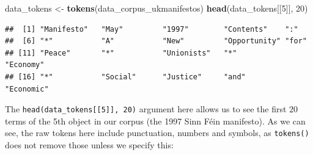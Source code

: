 \documentclass[
]{book}
\newenvironment{Shaded}{\begin{snugshade}}{\end{snugshade}}
\newcommand{\DecValTok}[1]{\textcolor[rgb]{0.00,0.00,0.81}{#1}}
\newcommand{\FunctionTok}[1]{\textcolor[rgb]{0.13,0.29,0.53}{\textbf{#1}}}
\newcommand{\NormalTok}[1]{#1}
\newcommand{\OtherTok}[1]{\textcolor[rgb]{0.56,0.35,0.01}{#1}}
\begin{document}
\begin{Shaded}
\begin{Highlighting}[]
\NormalTok{data\_tokens }\OtherTok{\textless{}{-}} \FunctionTok{tokens}\NormalTok{(data\_corpus\_ukmanifestos)}
\FunctionTok{head}\NormalTok{(data\_tokens[[}\DecValTok{5}\NormalTok{]], }\DecValTok{20}\NormalTok{)}
\end{Highlighting}
\end{Shaded}

\begin{verbatim}
##  [1] "Manifesto"   "May"         "1997"        "Contents"    ":"          
##  [6] "*"           "A"           "New"         "Opportunity" "for"        
## [11] "Peace"       "*"           "Unionists"   "*"           "Economy"    
## [16] "*"           "Social"      "Justice"     "and"         "Economic"
\end{verbatim}

The \texttt{head(data\_tokens{[}{[}5{]}{]},\ 20)} argument here allows us to see the first \(20\) terms of the 5th object in our corpus (the 1997 Sinn Féin manifesto). As we can see, the raw tokens here include punctuation, numbers and symbols, as \texttt{tokens()} does not remove those unless we specify this:
\end{document}
